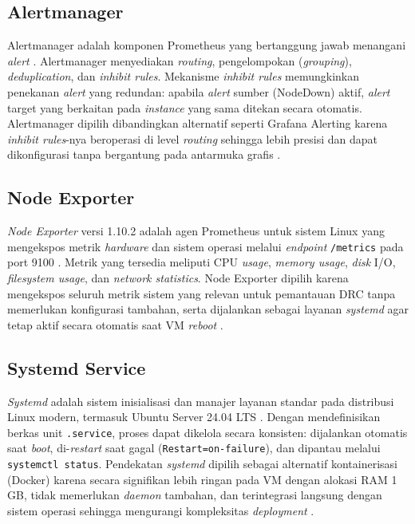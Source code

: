 \documentclass[10pt,twocolumn]{article}
\begin{document}
\subsection{Alertmanager}

Alertmanager adalah komponen Prometheus yang bertanggung jawab menangani \textit{alert} \cite{cncf2023}.
Alertmanager menyediakan \textit{routing}, pengelompokan (\textit{grouping}), \textit{deduplication},
dan \textit{inhibit rules}. Mekanisme \textit{inhibit rules} memungkinkan penekanan \textit{alert} yang
redundan: apabila \textit{alert} sumber (NodeDown) aktif, \textit{alert} target yang berkaitan pada
\textit{instance} yang sama ditekan secara otomatis. Alertmanager dipilih dibandingkan alternatif
seperti Grafana Alerting karena \textit{inhibit rules}-nya beroperasi di level \textit{routing}
sehingga lebih presisi dan dapat dikonfigurasi tanpa bergantung pada antarmuka grafis \cite{cncf2023}.

\subsection{Node Exporter}

\textit{Node Exporter} versi 1.10.2 adalah agen Prometheus untuk sistem Linux yang mengekspos metrik
\textit{hardware} dan sistem operasi melalui \textit{endpoint} \texttt{/metrics} pada port 9100
\cite{cncf2023}. Metrik yang tersedia meliputi CPU \textit{usage}, \textit{memory usage},
\textit{disk} I/O, \textit{filesystem usage}, dan \textit{network statistics}. Node Exporter dipilih
karena mengekspos seluruh metrik sistem yang relevan untuk pemantauan DRC tanpa memerlukan konfigurasi
tambahan, serta dijalankan sebagai layanan \textit{systemd} agar tetap aktif secara otomatis saat VM
\textit{reboot} \cite{turnbull2018}.

\subsection{Systemd Service}

\textit{Systemd} adalah sistem inisialisasi dan manajer layanan standar pada distribusi Linux modern,
termasuk Ubuntu Server 24.04 LTS \cite{linux2023}. Dengan mendefinisikan berkas unit \texttt{.service},
proses dapat dikelola secara konsisten: dijalankan otomatis saat \textit{boot}, di-\textit{restart}
saat gagal (\texttt{Restart=on-failure}), dan dipantau melalui \texttt{systemctl status}. Pendekatan
\textit{systemd} dipilih sebagai alternatif kontainerisasi (Docker) karena secara signifikan lebih
ringan pada VM dengan alokasi RAM 1 GB, tidak memerlukan \textit{daemon} tambahan, dan terintegrasi
langsung dengan sistem operasi sehingga mengurangi kompleksitas \textit{deployment} \cite{linux2023}.
\end{document}
